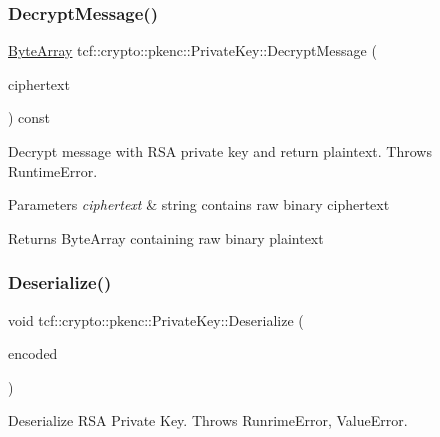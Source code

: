 \subsubsection{\texorpdfstring{Decrypt\+Message()}{DecryptMessage()}}
{\footnotesize\ttfamily \hyperlink{types_8h_a35da937e2331acce98d47f44892f4a76}{Byte\+Array} tcf\+::crypto\+::pkenc\+::\+Private\+Key\+::\+Decrypt\+Message (\begin{DoxyParamCaption}\item[{const \hyperlink{types_8h_a35da937e2331acce98d47f44892f4a76}{Byte\+Array} \&}]{ciphertext }\end{DoxyParamCaption}) const}

Decrypt message with R\+SA private key and return plaintext. Throws Runtime\+Error.


\begin{DoxyParams}{Parameters}
{\em ciphertext} & string contains raw binary ciphertext \\
\hline
\end{DoxyParams}
\begin{DoxyReturn}{Returns}
Byte\+Array containing raw binary plaintext 
\end{DoxyReturn}
\mbox{\label{classtcf_1_1crypto_1_1pkenc_1_1PrivateKey_ad18262c20398caae0c5243cbddfd0d24}} 
\subsubsection{\texorpdfstring{Deserialize()}{Deserialize()}}
{\footnotesize\ttfamily void tcf\+::crypto\+::pkenc\+::\+Private\+Key\+::\+Deserialize (\begin{DoxyParamCaption}\item[{const std\+::string \&}]{encoded }\end{DoxyParamCaption})}

Deserialize R\+SA Private Key. Throws Runrime\+Error, Value\+Error. \mbox{\label{classtcf_1_1crypto_1_1pkenc_1_1PrivateKey_a7b7d056b923d999356da1fee68e7247d}} 
